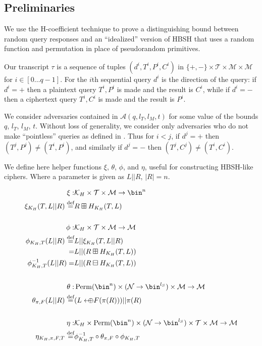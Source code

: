\documentclass[eprint.tex]{subfiles}
\begin{document}
\subsection{Preliminaries}
We use the H-coefficient technique to prove a distinguishing bound
between random query responses and
an ``idealized'' version of HBSH that uses a random function and permutation
in place of pseudorandom primitives.

Our transcript $\tau$ is a sequence of tuples
$(d^i, T^i, P^i, C^i)$
in
$\{+, -\} \times \mathcal{T} \times \mathcal{M} \times \mathcal{M}$
for $i \in [0 \ldots q-1]$.
For the $i$th sequential query
$d^i$ is the direction of the query:
if $d^i = +$ then a plaintext query $T^i, P^i$ is made and the result is $C^i$,
while if $d^i = -$ then a ciphertext query $T^i, C^i$ is made and the result is $P^i$.

We consider adversaries contained in $\mathcal{A}(q, l_T, l_M, t)$ for some value of
the bounds $q$, $l_T$, $l_M$, $t$.
Without loss of generality, we consider only adversaries who do not make ``pointless''
queries as defined in \cite{cmc}. Thus for $i < j$, if $d^j = +$ then
$(T^j, P^j) \neq (T^i, P^i)$, and similarly if $d^j = -$ then
$(T^j, C^j) \neq (T^i, C^i)$.

We define here
helper functions $\xi$, $\theta$, $\phi$, and $\eta$, useful for constructing
HBSH-like ciphers. Where a parameter is given as
$L || R$, $|R|=n$.

\begin{align*}
    \xi :& \mathcal{K}_H \times \mathcal{T} \times \mathcal{M} \rightarrow \bin^n \\
    \xi_{K_H}(T, L||R) \defeq& R \boxplus H_{K_H}(T, L) \\
    \vphantom{|} \\
    \phi :& \mathcal{K}_H \times \mathcal{T} \times \mathcal{M} \rightarrow \mathcal{M} \\
    \phi_{K_H, T}(L || R) \defeq& L || \xi_{K_H}(T, L||R) \\
    =& L || (R \boxplus H_{K_H}(T, L)) \\
    \phi^{-1}_{K_H, T}(L || R) =& L || (R \boxminus H_{K_H}(T, L)) \\
    \vphantom{|} \\
    \theta :& \Perm(\bin^n) \times (\mathcal{N} \rightarrow \bin^{l_S}) \times \mathcal{M} \rightarrow \mathcal{M} \\
    \theta_{\pi, F}(L || R) \defeq& (L \arrowoplus F(\pi(R))) || \pi(R) \\
    \vphantom{|} \\
    \eta :& \mathcal{K}_H \times \Perm(\bin^n) \times (\mathcal{N} \rightarrow \bin^{l_S}) \times \mathcal{T} \times \mathcal{M} \rightarrow \mathcal{M} \\
    \eta_{K_H, \pi, F, T} \defeq& \phi_{K_H,T}^{-1} \circ \theta_{\pi, F} \circ \phi_{K_H,T} \\
\end{align*}
\end{document}
